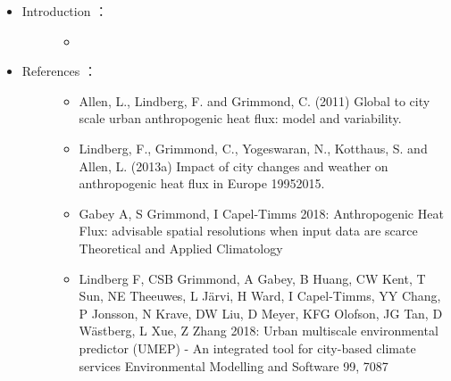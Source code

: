 \documentclass[letterpaper,10pt,english]{sphinxmanual}
\begin{document}
\begin{itemize}
\item {} \begin{description}
\item[{Introduction  ：}] \leavevmode\begin{itemize}
\item {} 

\end{itemize}

\end{description}

\item {} \begin{description}
\item[{References  ：}] \leavevmode\begin{itemize}
\item {} 
Allen, L., Lindberg, F. and Grimmond, C. (2011) Global to city scale urban anthropogenic heat flux: model and variability. 

\item {} 
Lindberg, F., Grimmond, C., Yogeswaran, N., Kotthaus, S. and Allen, L. (2013a) Impact of city changes and weather on anthropogenic heat flux in Europe 1995\textendash{}2015. 

\item {} 
Gabey A, S Grimmond, I Capel-Timms 2018: Anthropogenic Heat Flux: advisable spatial resolutions when input data are scarce Theoretical and Applied Climatology 

\item {} 
Lindberg F, CSB Grimmond, A Gabey, B Huang, CW Kent, T Sun, NE Theeuwes, L Järvi, H Ward, I Capel-Timms, YY Chang, P Jonsson, N Krave, DW Liu, D Meyer, KFG Olofson, JG Tan, D Wästberg, L Xue, Z Zhang 2018: Urban multiscale environmental predictor (UMEP) - An integrated tool for city-based climate services Environmental Modelling and Software 99, 70\textendash{}87 

\end{itemize}

\end{description}

\end{itemize}
\end{document}
